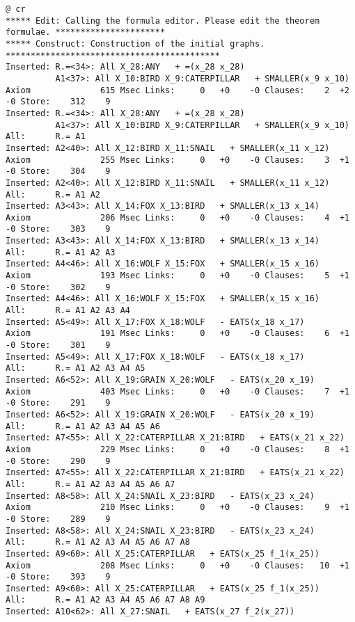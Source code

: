 {\begin{verbatim}
@ cr
***** Edit: Calling the formula editor. Please edit the theorem formulae. **********************
***** Construct: Construction of the initial graphs. *******************************************
Inserted: R.=<34>: All X_28:ANY   + =(x_28 x_28)
          A1<37>: All X_10:BIRD X_9:CATERPILLAR   + SMALLER(x_9 x_10)
Axiom              615 Msec Links:     0   +0    -0 Clauses:    2  +2  -0 Store:    312    9
Inserted: R.=<34>: All X_28:ANY   + =(x_28 x_28)
          A1<37>: All X_10:BIRD X_9:CATERPILLAR   + SMALLER(x_9 x_10)
All:      R.= A1 
Inserted: A2<40>: All X_12:BIRD X_11:SNAIL   + SMALLER(x_11 x_12)
Axiom              255 Msec Links:     0   +0    -0 Clauses:    3  +1  -0 Store:    304    9
Inserted: A2<40>: All X_12:BIRD X_11:SNAIL   + SMALLER(x_11 x_12)
All:      R.= A1 A2 
Inserted: A3<43>: All X_14:FOX X_13:BIRD   + SMALLER(x_13 x_14)
Axiom              206 Msec Links:     0   +0    -0 Clauses:    4  +1  -0 Store:    303    9
Inserted: A3<43>: All X_14:FOX X_13:BIRD   + SMALLER(x_13 x_14)
All:      R.= A1 A2 A3 
Inserted: A4<46>: All X_16:WOLF X_15:FOX   + SMALLER(x_15 x_16)
Axiom              193 Msec Links:     0   +0    -0 Clauses:    5  +1  -0 Store:    302    9
Inserted: A4<46>: All X_16:WOLF X_15:FOX   + SMALLER(x_15 x_16)
All:      R.= A1 A2 A3 A4 
Inserted: A5<49>: All X_17:FOX X_18:WOLF   - EATS(x_18 x_17)
Axiom              191 Msec Links:     0   +0    -0 Clauses:    6  +1  -0 Store:    301    9
Inserted: A5<49>: All X_17:FOX X_18:WOLF   - EATS(x_18 x_17)
All:      R.= A1 A2 A3 A4 A5 
Inserted: A6<52>: All X_19:GRAIN X_20:WOLF   - EATS(x_20 x_19)
Axiom              403 Msec Links:     0   +0    -0 Clauses:    7  +1  -0 Store:    291    9
Inserted: A6<52>: All X_19:GRAIN X_20:WOLF   - EATS(x_20 x_19)
All:      R.= A1 A2 A3 A4 A5 A6 
Inserted: A7<55>: All X_22:CATERPILLAR X_21:BIRD   + EATS(x_21 x_22)
Axiom              229 Msec Links:     0   +0    -0 Clauses:    8  +1  -0 Store:    290    9
Inserted: A7<55>: All X_22:CATERPILLAR X_21:BIRD   + EATS(x_21 x_22)
All:      R.= A1 A2 A3 A4 A5 A6 A7 
Inserted: A8<58>: All X_24:SNAIL X_23:BIRD   - EATS(x_23 x_24)
Axiom              210 Msec Links:     0   +0    -0 Clauses:    9  +1  -0 Store:    289    9
Inserted: A8<58>: All X_24:SNAIL X_23:BIRD   - EATS(x_23 x_24)
All:      R.= A1 A2 A3 A4 A5 A6 A7 A8 
Inserted: A9<60>: All X_25:CATERPILLAR   + EATS(x_25 f_1(x_25))
Axiom              208 Msec Links:     0   +0    -0 Clauses:   10  +1  -0 Store:    393    9
Inserted: A9<60>: All X_25:CATERPILLAR   + EATS(x_25 f_1(x_25))
All:      R.= A1 A2 A3 A4 A5 A6 A7 A8 A9 
Inserted: A10<62>: All X_27:SNAIL   + EATS(x_27 f_2(x_27))

\end{verbatim}}
